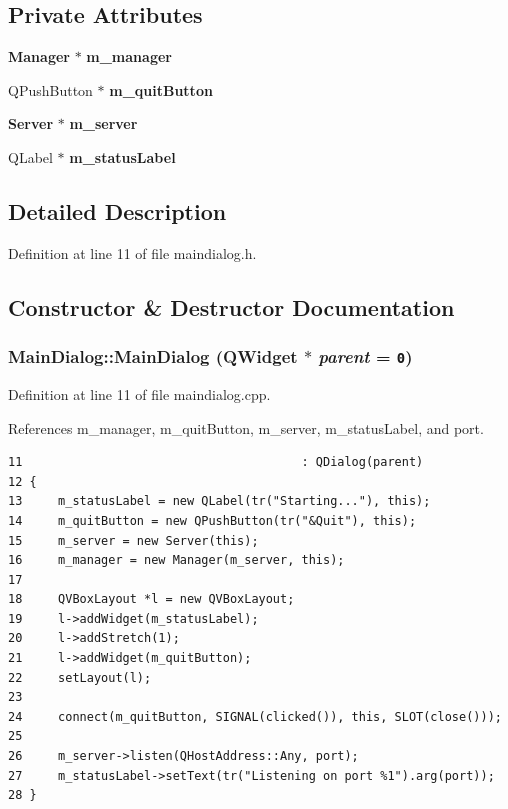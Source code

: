 \subsection*{Private Attributes}
\begin{CompactItemize}
\item 
{\bf Manager} $\ast$ {\bf m\_\-manager}
\item 
QPushButton $\ast$ {\bf m\_\-quitButton}
\item 
{\bf Server} $\ast$ {\bf m\_\-server}
\item 
QLabel $\ast$ {\bf m\_\-statusLabel}
\end{CompactItemize}


\subsection{Detailed Description}


Definition at line 11 of file maindialog.h.

\subsection{Constructor \& Destructor Documentation}
\subsubsection{\setlength{\rightskip}{0pt plus 5cm}MainDialog::MainDialog (QWidget $\ast$ {\em parent} = {\tt 0})}\label{classMainDialog_e908b2fb60d524f7c4690570ba1d6e3d}




Definition at line 11 of file maindialog.cpp.

References m\_\-manager, m\_\-quitButton, m\_\-server, m\_\-statusLabel, and port.

\begin{Code}\begin{verbatim}11                                       : QDialog(parent)
12 {
13     m_statusLabel = new QLabel(tr("Starting..."), this);
14     m_quitButton = new QPushButton(tr("&Quit"), this);
15     m_server = new Server(this);
16     m_manager = new Manager(m_server, this);
17 
18     QVBoxLayout *l = new QVBoxLayout;
19     l->addWidget(m_statusLabel);
20     l->addStretch(1);
21     l->addWidget(m_quitButton);
22     setLayout(l);
23 
24     connect(m_quitButton, SIGNAL(clicked()), this, SLOT(close()));
25 
26     m_server->listen(QHostAddress::Any, port);
27     m_statusLabel->setText(tr("Listening on port %1").arg(port));
28 }
\end{verbatim}
\end{Code}




